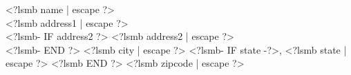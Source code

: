 \documentclass{scrartcl}
\begin{document}
\thispagestyle{empty}
\noindent <?lsmb name | escape ?>\\
<?lsmb address1 | escape ?> \\
<?lsmb- IF address2 ?>
<?lsmb address2 | escape ?> \\
<?lsmb- END ?>
<?lsmb city | escape ?>
<?lsmb- IF state -?>, <?lsmb state | escape ?> <?lsmb END ?> <?lsmb zipcode | escape ?>\\
\end{document}
